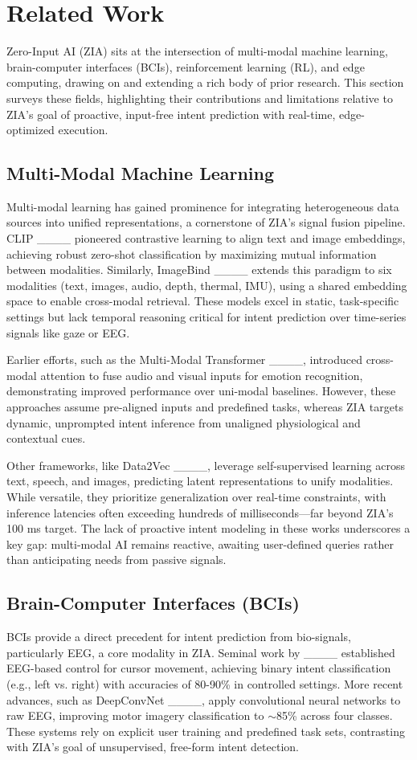 \section{Related Work}
Zero-Input AI (ZIA) sits at the intersection of multi-modal machine learning, brain-computer interfaces (BCIs), reinforcement learning (RL), and edge computing, drawing on and extending a rich body of prior research. This section surveys these fields, highlighting their contributions and limitations relative to ZIA's goal of proactive, input-free intent prediction with real-time, edge-optimized execution.

\subsection{Multi-Modal Machine Learning}
Multi-modal learning has gained prominence for integrating heterogeneous data sources into unified representations, a cornerstone of ZIA's signal fusion pipeline. CLIP ____ pioneered contrastive learning to align text and image embeddings, achieving robust zero-shot classification by maximizing mutual information between modalities. Similarly, ImageBind ____ extends this paradigm to six modalities (text, images, audio, depth, thermal, IMU), using a shared embedding space to enable cross-modal retrieval. These models excel in static, task-specific settings but lack temporal reasoning critical for intent prediction over time-series signals like gaze or EEG. 

Earlier efforts, such as the Multi-Modal Transformer ____, introduced cross-modal attention to fuse audio and visual inputs for emotion recognition, demonstrating improved performance over uni-modal baselines. However, these approaches assume pre-aligned inputs and predefined tasks, whereas ZIA targets dynamic, unprompted intent inference from unaligned physiological and contextual cues.

Other frameworks, like Data2Vec ____, leverage self-supervised learning across text, speech, and images, predicting latent representations to unify modalities. While versatile, they prioritize generalization over real-time constraints, with inference latencies often exceeding hundreds of milliseconds—far beyond ZIA's 100 ms target. The lack of proactive intent modeling in these works underscores a key gap: multi-modal AI remains reactive, awaiting user-defined queries rather than anticipating needs from passive signals.

\subsection{Brain-Computer Interfaces (BCIs)}
BCIs provide a direct precedent for intent prediction from bio-signals, particularly EEG, a core modality in ZIA. Seminal work by ____ established EEG-based control for cursor movement, achieving binary intent classification (e.g., left vs. right) with accuracies of 80-90\% in controlled settings. More recent advances, such as DeepConvNet ____, apply convolutional neural networks to raw EEG, improving motor imagery classification to $\sim$85\% across four classes. These systems rely on explicit user training and predefined task sets, contrasting with ZIA's goal of unsupervised, free-form intent detection.

